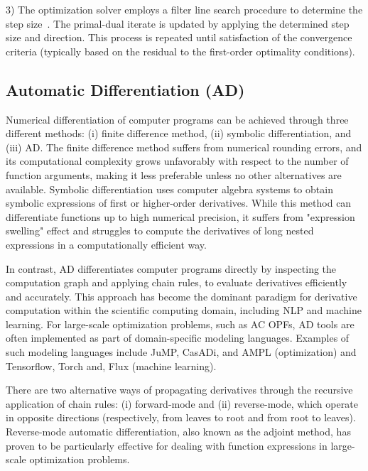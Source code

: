 3) The optimization solver employs a filter line search procedure to
determine the step size~\cite{wachter2006implementation}. The primal-dual iterate is updated by
applying the determined step size and direction. This process is
repeated until satisfaction of the convergence criteria (typically based on the residual
to the first-order optimality conditions).

\subsection{Automatic Differentiation (AD)}
Numerical differentiation of computer programs can be achieved through
three different methods: (i) finite difference method, (ii) symbolic
differentiation, and (iii) AD. The finite difference method suffers
from numerical rounding errors, and its computational complexity grows
unfavorably with respect to the number of function arguments, making
it less preferable unless no other alternatives are
available. Symbolic differentiation uses computer algebra systems to
obtain symbolic expressions of first or higher-order
derivatives. While this method can differentiate functions up to high
numerical precision, it suffers from "expression swelling" effect and
struggles to compute the derivatives of long nested expressions in a
computationally efficient way.

In contrast, AD differentiates computer
programs directly by inspecting the computation graph and applying chain rules,
to evaluate derivatives efficiently and accurately.
This approach has become the dominant paradigm for derivative computation within the
scientific computing domain, including NLP and
machine learning. For large-scale optimization problems, such as AC
OPFs, AD tools are often implemented as part of domain-specific
modeling languages. Examples of such modeling languages include JuMP,
CasADi, and AMPL (optimization) and Tensorflow, Torch and, Flux
(machine learning).

There are two alternative ways of propagating derivatives through the
recursive application of chain rules: (i) forward-mode and (ii)
reverse-mode, which operate in opposite directions (respectively, from leaves to
root and from root to leaves). Reverse-mode automatic
differentiation, also known as the adjoint method, has proven to be
particularly effective for dealing with function expressions in
large-scale optimization problems.

